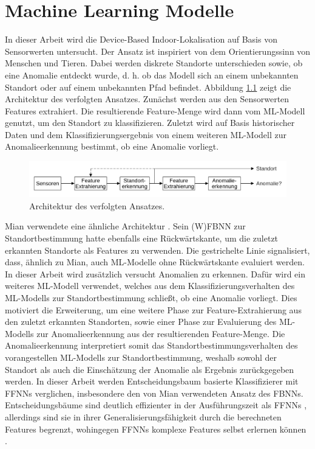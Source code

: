 \chapter{Machine Learning Modelle}
In dieser Arbeit wird die Device-Based Indoor-Lokalisation auf Basis von Sensorwerten untersucht.
Der Ansatz ist inspiriert von dem Orientierungssinn von Menschen und Tieren.
Dabei werden diskrete Standorte unterschieden sowie, ob eine Anomalie entdeckt wurde,
d. h. ob das Modell sich an einem unbekannten Standort oder auf einem unbekannten Pfad befindet.
\newline
\newline
Abbildung \ref{fig:model_idea} zeigt die Architektur des verfolgten Ansatzes.
Zunächst werden aus den Sensorwerten Features extrahiert.
Die resultierende Feature-Menge wird dann vom ML-Modell genutzt, um den Standort zu klassifizieren.
Zuletzt wird auf Basis historischer Daten und dem Klassifizierungsergebnis von einem weiteren ML-Modell zur Anomalieerkennung bestimmt, ob eine Anomalie vorliegt.
\begin{figure}[h!]
    \centering
    \includegraphics[width=\linewidth]{images/model_idea.png}
    \caption{Architektur des verfolgten Ansatzes.}
    \label{fig:model_idea}
\end{figure}
\newline
Mian verwendete eine ähnliche Architektur \cite{naveedThesis}.
Sein (W)FBNN zur Standortbestimmung hatte ebenfalls eine Rückwärtskante, um die zuletzt erkannten Standorte als Features zu verwenden.
Die gestrichelte Linie signalisiert, dass, ähnlich zu Mian, auch ML-Modelle ohne Rückwärtskante evaluiert werden.
In dieser Arbeit wird zusätzlich versucht Anomalien zu erkennen.
Dafür wird ein weiteres ML-Modell verwendet, welches aus dem Klassifizierungsverhalten des ML-Modells zur Standortbestimmung schließt, ob eine Anomalie vorliegt.
Dies motiviert die Erweiterung, um eine weitere Phase zur Feature-Extrahierung aus den zuletzt erkannten Standorten,
sowie einer Phase zur Evaluierung des ML-Modells zur Anomalieerkennung aus der resultierenden Feature-Menge.
\newpage
Die Anomalieerkennung interpretiert somit das Standortbestimmungsverhalten des vorangestellen ML-Modells zur Standortbestimmung,
weshalb sowohl der Standort als auch die Einschätzung der Anomalie als Ergebnis zurückgegeben werden.
\newline
\newline
In dieser Arbeit werden Entscheidungsbaum basierte Klassifizierer mit FFNNs verglichen, insbesondere den von Mian verwendeten Ansatz des FBNNs.
Entscheidungsbäume sind deutlich effizienter in der Ausführungszeit als FFNNs \cite{dymelThesis},
allerdings sind sie in ihrer Generalisierungsfähigkeit durch die berechneten Features begrenzt,
wohingegen FFNNs komplexe Features selbst erlernen können \cite{seide2011feature}.







